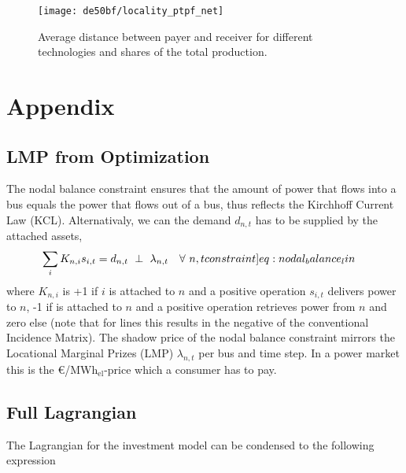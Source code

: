 \documentclass[11pt,twocolumn]{article}
\newcommand{\resultsin}[1]{\hspace{6pt} \bot  \hspace{6pt} #1}
\newcommand{\Forall}[1]{\hspace{10pt} \forall \,\, #1 }
\newcommand{\state}{s_{i,t}}
\newcommand{\nodalgeneration}[1][n]{g_{#1,t}}
\newcommand{\flow}{f_{\ell,t}}
\newcommand{\lmp}[1][n]{\lambda_{#1,t}}
\newcommand{\demand}[1][n]{d_{#1,t}}
\newcommand{\nodaldemand}[1][n]{d_{#1,t}}
\newcommand{\incidence}[1][n]{K_{#1,\ell}}
\newcommand{\incidenceasset}[1][n]{K_{#1,i}}
\newcommand{\megawatthour}{MWh$_\text{el}$}
\begin{document}
\begin{figure}
    \centering
    \texttt{[image: de50bf/locality\_ptpf\_net]}
    \label{fig:locality}
    \caption{Average distance between payer and receiver for different technologies and shares of the total production.}
\end{figure}

\clearpage
\appendix

\section{Appendix}

\renewcommand\theequation{\thesection.\arabic{equation}}
\setcounter{equation}{0}

\renewcommand\thefigure{\thesection.\arabic{figure}}    
\setcounter{figure}{0}    

\subsection{LMP from Optimization}
The nodal balance constraint ensures that the amount of power that flows into a bus equals the power that flows out of a bus, thus reflects the Kirchhoff Current Law (KCL). Alternativaly, we can the demand $\demand$ has to be supplied by the attached assets,  
\begin{align}
    \sum_i \incidenceasset \state  &=  \demand 
     \resultsin{\lmp} \Forall{n,t}
    \label[constraint]{eq:nodal_balance_lin}
\end{align}
where $\incidenceasset$ is +1 if $i$ is attached to $n$ and a positive operation $\state$ delivers power to $n$, -1 if is attached to $n$ and a positive operation retrieves power from $n$ and zero else (note that for lines this results in the negative of the conventional Incidence Matrix).  
The shadow price of the nodal balance constraint mirrors the Locational Marginal Prizes (LMP) $\lmp$ per bus and time step. In a power market this is the \euro/\megawatthour-price which a consumer has to pay.\\

\subsection{Full Lagrangian}
\label{sec:full_lagrangian}
The Lagrangian for the investment model can be condensed to the following expression
\end{document}
